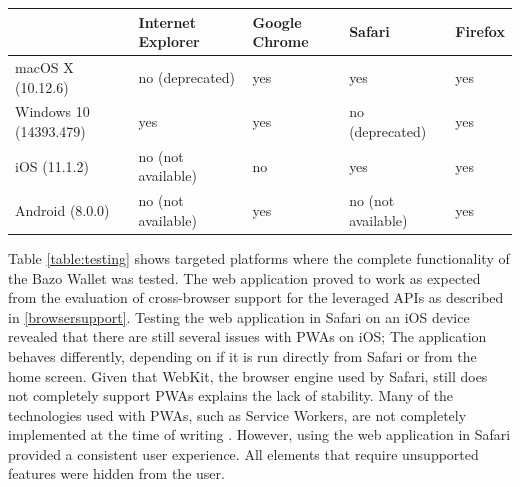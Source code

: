 \begin{center}
    \begin{tabular}{ | l | l | l | l | p{2cm} |}
    \hline
      & Internet Explorer & Google Chrome & Safari & Firefox \\ \hline
    macOS X (10.12.6)  & no (deprecated) & yes & yes & yes \\ \hline
    Windows 10 (14393.479)  & yes & yes & no (deprecated) & yes \\ \hline    
    iOS (11.1.2)  & no (not available) & no & yes & yes \\ \hline
    Android (8.0.0)  & no (not available) & yes & no (not available) & yes \\ \hline
    \end{tabular}
    \label{table:testing}
    \end{center}
Table \ref{table:testing} shows targeted platforms where the complete functionality of the Bazo Wallet was tested. The web application proved to work as expected from the evaluation of cross-browser support for the leveraged APIs as described in \ref{browsersupport}. Testing the web application in Safari on an iOS device revealed that there are still several issues with PWAs on iOS; The application behaves differently, depending on if it is run directly from Safari or from the home screen. Given that WebKit, the browser engine used by Safari, still does not completely support PWAs explains the lack of stability. Many of the technologies used with PWAs, such as Service Workers, are not completely implemented at the time of writing \cite{webkitsw}. However, using the web application in Safari provided a consistent user experience. All elements that require unsupported features were hidden from the user.
 
